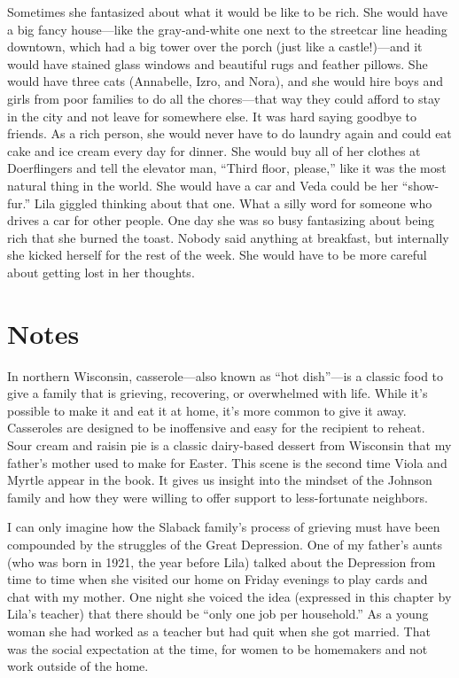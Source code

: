 \documentclass[
  letterpaper,
]{book}
\begin{document}
Sometimes she fantasized about what it would be like to be rich. She
would have a big fancy house---like the gray-and-white one next to the
streetcar line heading downtown, which had a big tower over the porch
(just like a castle!)---and it would have stained glass windows and
beautiful rugs and feather pillows. She would have three cats
(Annabelle, Izro, and Nora), and she would hire boys and girls from poor
families to do all the chores---that way they could afford to stay in
the city and not leave for somewhere else. It was hard saying goodbye to
friends. As a rich person, she would never have to do laundry again and
could eat cake and ice cream every day for dinner. She would buy all of
her clothes at Doerflingers and tell the elevator man, ``Third floor,
please,'' like it was the most natural thing in the world. She would
have a car and Veda could be her ``show-fur.'' Lila giggled thinking
about that one. What a silly word for someone who drives a car for other
people. One day she was so busy fantasizing about being rich that she
burned the toast. Nobody said anything at breakfast, but internally she
kicked herself for the rest of the week. She would have to be more
careful about getting lost in her thoughts.

\section{Notes}\label{notes-15}

In northern Wisconsin, casserole---also known as ``hot dish''---is a
classic food to give a family that is grieving, recovering, or
overwhelmed with life. While it's possible to make it and eat it at
home, it's more common to give it away. Casseroles are designed to be
inoffensive and easy for the recipient to reheat. Sour cream and raisin
pie is a classic dairy-based dessert from Wisconsin that my father's
mother used to make for Easter. This scene is the second time Viola and
Myrtle appear in the book. It gives us insight into the mindset of the
Johnson family and how they were willing to offer support to
less-fortunate neighbors.

I can only imagine how the Slaback family's process of grieving must
have been compounded by the struggles of the Great Depression. One of my
father's aunts (who was born in 1921, the year before Lila) talked about
the Depression from time to time when she visited our home on Friday
evenings to play cards and chat with my mother. One night she voiced the
idea (expressed in this chapter by Lila's teacher) that there should be
``only one job per household.'' As a young woman she had worked as a
teacher but had quit when she got married. That was the social
expectation at the time, for women to be homemakers and not work outside
of the home.
\end{document}
